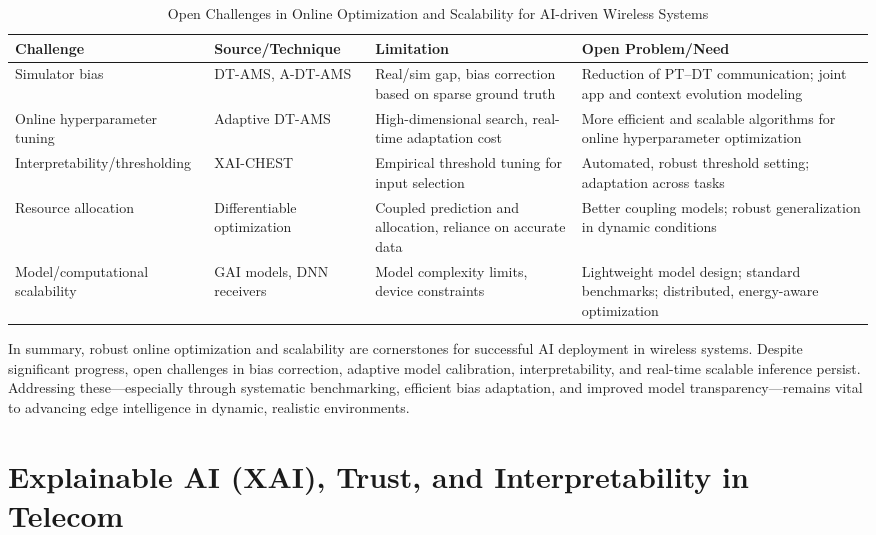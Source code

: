 \documentclass[sigconf]{acmart}
\begin{document}
\begin{table*}[htbp]
\centering
\caption{Open Challenges in Online Optimization and Scalability for AI-driven Wireless Systems}
\label{tab:online_scalability_challenges}
\begin{adjustbox}{max width=\textwidth}
\begin{tabular}{@{}llll@{}}
\toprule
\textbf{Challenge} & \textbf{Source/Technique} & \textbf{Limitation} & \textbf{Open Problem/Need} \\ \midrule
Simulator bias & DT-AMS, A-DT-AMS~\cite{ref37} & Real/sim gap, bias correction based on sparse ground truth & Reduction of PT–DT communication; joint app and context evolution modeling \\
Online hyperparameter tuning & Adaptive DT-AMS~\cite{ref37} & High-dimensional search, real-time adaptation cost & More efficient and scalable algorithms for online hyperparameter optimization \\
Interpretability/thresholding & XAI-CHEST~\cite{ref38,ref41} & Empirical threshold tuning for input selection & Automated, robust threshold setting; adaptation across tasks \\
Resource allocation & Differentiable optimization~\cite{ref48} & Coupled prediction and allocation, reliance on accurate data & Better coupling models; robust generalization in dynamic conditions \\
Model/computational scalability & GAI models, DNN receivers~\cite{ref43,ref44} & Model complexity limits, device constraints & Lightweight model design; standard benchmarks; distributed, energy-aware optimization \\
\bottomrule
\end{tabular}
\end{adjustbox}
\end{table*}

In summary, robust online optimization and scalability are cornerstones for successful AI deployment in wireless systems. Despite significant progress, open challenges in bias correction, adaptive model calibration, interpretability, and real-time scalable inference persist. Addressing these—especially through systematic benchmarking, efficient bias adaptation, and improved model transparency—remains vital to advancing edge intelligence in dynamic, realistic environments.

\section{Explainable AI (XAI), Trust, and Interpretability in Telecom}
\end{document}

